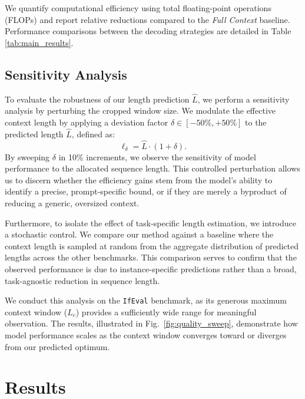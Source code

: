 \documentclass{article}
\theoremstyle{plain}
\theoremstyle{definition}
\theoremstyle{remark}
\begin{document}
We quantify computational efficiency using total floating-point operations (FLOPs) and report relative reductions compared to the \textit{Full Context} baseline. Performance comparisons between the decoding strategies are detailed in Table \ref{tab:main_results}.

\subsection{Sensitivity Analysis}

To evaluate the robustness of our length prediction $\hat{L}$, we perform a sensitivity analysis by perturbing the cropped window size. We modulate the effective context length by applying a deviation factor $\delta \in [-50\%, +50\%]$ to the predicted length $\hat{L}$, defined as:
\begin{equation}
    \ell_{\delta} = \hat{L} \cdot (1 + \delta).
\end{equation}
By sweeping $\delta$ in 10\% increments, we observe the sensitivity of model performance to the allocated sequence length. This controlled perturbation allows us to discern whether the efficiency gains stem from the model's ability to identify a precise, prompt-specific bound, or if they are merely a byproduct of reducing a generic, oversized context.

Furthermore, to isolate the effect of task-specific length estimation, we introduce a stochastic control. We compare our method against a baseline where the context length is sampled at random from the aggregate distribution of predicted lengths across the other benchmarks. This comparison serves to confirm that the observed performance is due to instance-specific predictions rather than a broad, task-agnostic reduction in sequence length.

We conduct this analysis on the \texttt{IfEval} benchmark, as its generous maximum context window ($L_c$) provides a sufficiently wide range for meaningful observation. The results, illustrated in Fig.~\ref{fig:quality_sweep}, demonstrate how model performance scales as the context window converges toward or diverges from our predicted optimum.

\section{Results}
\label{sec:results}
\end{document}

